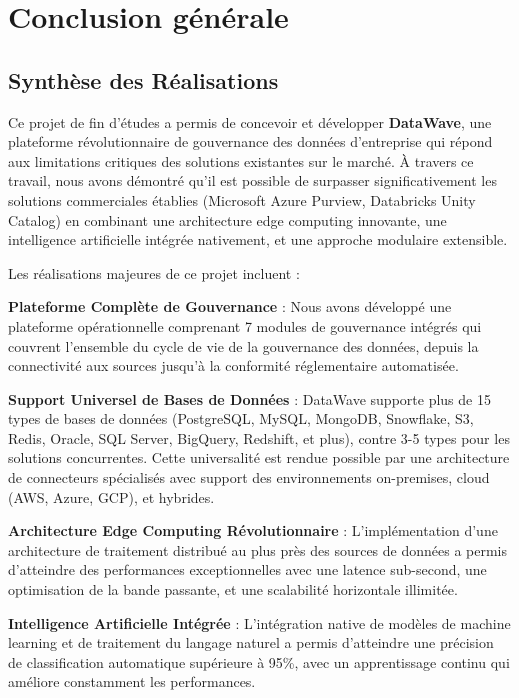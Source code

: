 \chapter*{Conclusion générale}


\section*{Synthèse des Réalisations}

Ce projet de fin d'études a permis de concevoir et développer \textbf{DataWave}, une plateforme révolutionnaire de gouvernance des données d'entreprise qui répond aux limitations critiques des solutions existantes sur le marché. À travers ce travail, nous avons démontré qu'il est possible de surpasser significativement les solutions commerciales établies (Microsoft Azure Purview, Databricks Unity Catalog) en combinant une architecture edge computing innovante, une intelligence artificielle intégrée nativement, et une approche modulaire extensible.

Les réalisations majeures de ce projet incluent :

\textbf{Plateforme Complète de Gouvernance} : Nous avons développé une plateforme opérationnelle comprenant 7 modules de gouvernance intégrés qui couvrent l'ensemble du cycle de vie de la gouvernance des données, depuis la connectivité aux sources jusqu'à la conformité réglementaire automatisée.

\textbf{Support Universel de Bases de Données} : DataWave supporte plus de 15 types de bases de données (PostgreSQL, MySQL, MongoDB, Snowflake, S3, Redis, Oracle, SQL Server, BigQuery, Redshift, et plus), contre 3-5 types pour les solutions concurrentes. Cette universalité est rendue possible par une architecture de connecteurs spécialisés avec support des environnements on-premises, cloud (AWS, Azure, GCP), et hybrides.

\textbf{Architecture Edge Computing Révolutionnaire} : L'implémentation d'une architecture de traitement distribué au plus près des sources de données a permis d'atteindre des performances exceptionnelles avec une latence sub-second, une optimisation de la bande passante, et une scalabilité horizontale illimitée.

\textbf{Intelligence Artificielle Intégrée} : L'intégration native de modèles de machine learning et de traitement du langage naturel a permis d'atteindre une précision de classification automatique supérieure à 95\%, avec un apprentissage continu qui améliore constamment les performances.

